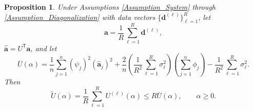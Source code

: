 \documentclass[12pt]{article}
\newcommand{\aVec}{\mathbf{a}}	%
\newcommand{\dVec}{\mathbf{d}}	%
\newcommand{\trans}[1]{{#1}^\mathsf{T}}	%
\newcommand{\dft}[1]{\widehat{#1}}	%
\newcommand{\regparam}{\alpha}  %
\newcommand{\filt}{\phi}
\newcommand{\mfilt}{\psi}
\newcommand{\noiseSD}{\sigma}	%
\newcommand{\U}{U}	%
\newtheorem{proposition}{Proposition}[section]
\begin{document}
\begin{proposition}
Under Assumptions \ref{Assumption_System} through \ref{Assumption_Diagonalization} with data vectors $\{\dVec^{(\ell)}\}_{\ell=1}^R$, let 
\begin{equation}
\label{eq:Averaged data}
\aVec = \frac{1}{R}\sum_{\ell=1}^R \dVec^{(\ell)},
\end{equation}
$\dft{\aVec} = \trans{U}\aVec$, and let
\begin{equation}
\label{eq:UPRE of Average}
\overline{U}(\regparam) = \frac{1}{n}\sum_{j=1}^{n} \left(\mfilt_j\right)^2\left(\dft{\aVec}_j\right)^2 + \frac{2}{n} \left(\frac{1}{R^2} \sum_{\ell=1}^R \noiseSD_\ell^2\right) \left(\sum_{j=1}^{n} \filt_j\right) - \frac{1}{R^2} \sum_{\ell=1}^R\noiseSD_\ell^2.
\end{equation}
Then
\begin{equation}
\label{eq:UPRE Bound}
\widetilde{U}(\regparam) = \frac{1}{R} \sum_{\ell=1}^R \U^{(\ell)}(\regparam) \leq R \overline{U}(\regparam), \qquad \regparam \geq 0.
\end{equation}
\end{proposition}
\end{document}
